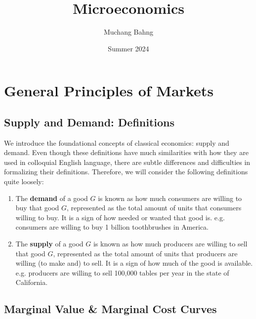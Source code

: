 \documentclass{article}
\begin{document}
\title{Microeconomics}
\author{Muchang Bahng}
\date{Summer 2024}

\maketitle
\tableofcontents
\pagebreak

\section{General Principles of Markets} 

  \subsection{Supply and Demand: Definitions}

    We introduce the foundational concepts of classical economics: supply and demand. Even though these definitions have much similarities with how they are used in colloquial English language, there are subtle differences and difficulties in formalizing their definitions. Therefore, we will consider the following definitions quite loosely:
    \begin{enumerate}
      \item The \textbf{demand} of a good $G$ is known as how much consumers are willing to buy that good $G$, represented as the total amount of units that consumers willing to buy. It is a sign of how needed or wanted that good is. e.g. consumers are willing to buy 1 billion toothbrushes in America.
      \item The \textbf{supply} of a good $G$ is known as how much producers are willing to sell that good $G$, represented as the total amount of units that producers are willing (to make and) to sell. It is a sign of how much of the good is available. e.g. producers are willing to sell 100,000 tables per year in the state of California.
    \end{enumerate}

  \subsection{Marginal Value \& Marginal Cost Curves}
\end{document}
